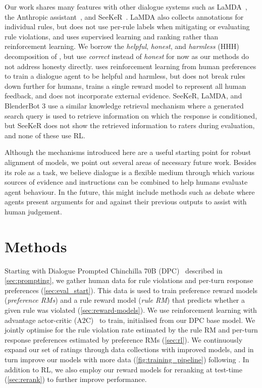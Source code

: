 Our work shares many features with other dialogue systems such as LaMDA~\citep{thoppilan2022lamda}, the Anthropic assistant~\citep{askell2021general, bai2022training}, and SeeKeR~\citep{shuster2022seeker}. LaMDA also collects annotations for individual rules, but does not use per-rule labels when mitigating or evaluating rule violations, and uses supervised learning and ranking rather than reinforcement learning. We borrow the \emph{helpful}, \emph{honest}, and \emph{harmless} (HHH) decomposition of \citet{askell2021general}, but use \emph{correct} instead of \emph{honest} for now as our methods do not address honesty directly.  \citet{bai2022training} uses reinforcement learning from human preferences to train a dialogue agent to be helpful and harmless, but does not break rules down further for humans, trains a single reward model to represent all human feedback, and does not incorporate external evidence. SeeKeR, LaMDA, and BlenderBot 3 use a similar knowledge retrieval mechanism where a generated search query is used to retrieve information on which the response is conditioned, but SeeKeR does not show the retrieved information to raters during evaluation, and none of these use RL.

Although the mechanisms introduced here are a useful starting point for robust alignment of models, we point out several areas of necessary future work. Besides its role as a task, we believe dialogue is a flexible medium through which various sources of evidence and instructions can be combined to help humans evaluate agent behaviour. In the future, this might include methods such as debate \citep{irving2018debate} where agents present arguments for and against their previous outputs to assist with human judgement.

\section{Methods} \label{sec:methods}
Starting with Dialogue Prompted Chinchilla 70B (DPC)~\citep{hoffmann2022training} described in \ref{sec:prompting}, we gather human data for rule violations and per-turn response preferences (\ref{sec:eval_start}). This data is used to train preference reward models (\emph{preference RMs}) and a rule reward model (\emph{rule RM}) that predicts whether a given rule was violated (\ref{sec:reward-models}). We use reinforcement learning with advantage actor-critic (A2C)~\citep{mnih2016a3c} to train, initialised from our DPC base model. We jointly optimise for the rule violation rate estimated by the rule RM and per-turn response preferences estimated by preference RMs (\ref{sec:rl}). We continuously expand our set of ratings through data collections with improved models, and in turn improve our models with more data (\ref{fig:training_pipeline}) following \citet{stiennon2020learning}. In addition to RL, we also employ our reward models for reranking at test-time (\ref{sec:rerank}) to further improve performance.

